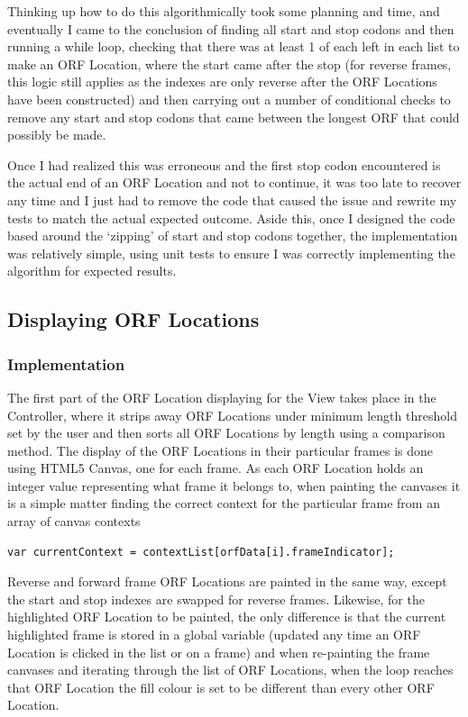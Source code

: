 Thinking up how to do this algorithmically took some planning and time, and eventually I came to the conclusion of finding all start and stop codons and then running a while loop, checking that there was at least 1 of each left in each list to make an ORF Location, where the start came after the stop (for reverse frames, this logic still applies as the indexes are only reverse after the ORF Locations have been constructed) and then carrying out a number of conditional checks to remove any start and stop codons that came between the longest ORF that could possibly be made.

Once I had realized this was erroneous and the first stop codon encountered is the actual end of an ORF Location and not to continue, it was too late to recover any time and I just had to remove the code that caused the issue and rewrite my tests to match the actual expected outcome. Aside this, once I designed the code based around the `zipping' of start and stop codons together, the implementation was relatively simple, using unit tests to ensure I was correctly implementing the algorithm for expected results.

\subsection{Displaying ORF Locations}
\subsubsection{Implementation}
The first part of the ORF Location displaying for the View takes place in the Controller, where it strips away ORF Locations under minimum length threshold set by the user and then sorts all ORF Locations by length using a comparison method. The display of the ORF Locations in their particular frames is done using HTML5 Canvas, one for each frame. As each ORF Location holds an integer value representing what frame it belongs to, when painting the canvases it is a simple matter finding the correct context  for the particular frame from an array of canvas contexts
\begin{verbatim}
var currentContext = contextList[orfData[i].frameIndicator];
\end{verbatim}
Reverse and forward frame ORF Locations are painted in the same way, except the start and stop indexes are swapped for reverse frames. Likewise, for the highlighted ORF Location to be painted, the only difference is that the current highlighted frame is stored in a global variable (updated any time an ORF Location is clicked in the list or on a frame) and when re-painting the frame canvases and iterating through the list of ORF Locations, when the loop reaches that ORF Location the fill colour is set to be different than every other ORF Location.

